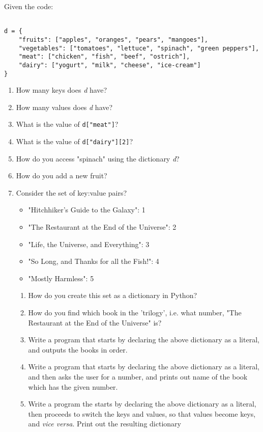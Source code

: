Given the code:
\begin{lstlisting}

d = {
    "fruits": ["apples", "oranges", "pears", "mangoes"],
    "vegetables": ["tomatoes", "lettuce", "spinach", "green peppers"],
    "meat": ["chicken", "fish", "beef", "ostrich"],
    "dairy": ["yogurt", "milk", "cheese", "ice-cream"]
}\end{lstlisting}
\begin{enumerate}
	\item How many keys does \textit{d} have?
	\item How many values does \textit{d} have?
	\item What is the value of 
\texttt{d["meat"]}?
	\item What is the value of 
\texttt{d["dairy"][2]}?
	\item How do you access "spinach" using the dictionary \textit{d}?
	\item How do you add a new fruit?
	\item Consider the set of key:value pairs?     
\begin{itemize}
	\item "Hitchhiker's Guide to the Galaxy": 1
	\item "The Restaurant at the End of the Universe": 2
	\item "Life, the Universe, and Everything": 3
	\item "So Long, and Thanks for all the Fish!": 4
	\item "Mostly Harmless": 5
\end{itemize}
\begin{enumerate}
	\item How do you create this set as a dictionary in      Python?
	\item How do you find which book in the 'trilogy', i.e. what      number, "The Restaurant at the End of the Universe"      is?
	\item Write a program that starts by declaring the above      dictionary as a literal, and outputs the books in      order.
	\item Write a program that starts by declaring the above      dictionary as a literal, and then asks the user for a      number, and prints out name of the book which has the given      number.
	\item Write a program the starts by declaring the above      dictionary as a literal, then proceeds to switch the keys      and values, so that values become keys, and \textit{vice      versa}.  Print out the resulting dictionary

\end{enumerate}
\end{enumerate}
